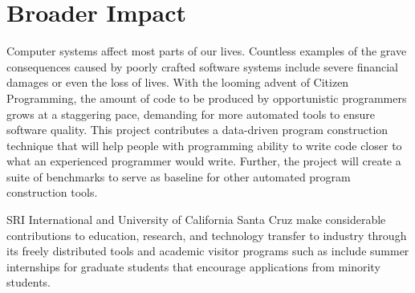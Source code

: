 \section*{Broader Impact} %
\label{sec:impact}

Computer systems affect most parts of our lives. Countless examples of 
the grave consequences caused by poorly crafted software systems include 
severe financial damages or even the loss of lives. With the looming 
advent of Citizen Programming, the amount of code to be produced by 
opportunistic programmers grows at a staggering pace, demanding for more 
automated tools to ensure software quality. This project contributes a 
data-driven program construction technique that will help people with 
programming ability to write code closer to what an experienced programmer 
would write. Further, the project will create a suite of benchmarks to 
serve as baseline for other automated program construction tools.

SRI International and University of California Santa Cruz make considerable 
contributions to education, research, and technology transfer to industry 
through its freely distributed tools and academic visitor programs such 
as include summer internships for graduate students that encourage 
applications from minority students.